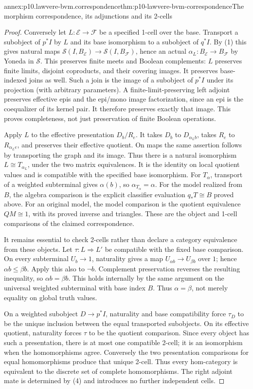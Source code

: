 \begin{annexitem}{annex:p10.lawvere-bvm.correspondence}{thm:p10-lawvere-bvm-correspondence}{The morphism correspondence, its adjunctions and its 2-cells}
\begin{proof}
Conversely let \(L:\mathcal E\to\mathcal F\) be a specified
1-cell over the base. Transport a subobject of \(p^*I\) by \(L\)
and its base isomorphism to a subobject of \(q^*I\).
By (1) this gives natural maps
\(\mathcal S(I,B_{\mathcal E})\to
\mathcal S(I,B_{\mathcal F})\), hence an actual
\(\alpha_L:B_{\mathcal E}\to B_{\mathcal F}\) by Yoneda in
\(\mathcal S\). This preserves finite meets and Boolean
complements: \(L\) preserves finite limits, disjoint coproducts,
and their covering images. It preserves base-indexed joins as well.
Such a join is the image of a subobject of \(p^*I\) under its
projection (with arbitrary parameters). A finite-limit-preserving
left adjoint preserves effective epis and the epi/mono image
factorization, since an epi is the coequalizer of its kernel pair.
It therefore preserves exactly that image. This proves completeness,
not just preservation of finite Boolean operations.

Apply \(L\) to the effective presentation \(D_b/R_e\).
It takes \(D_b\) to \(D_{\alpha_L b}\), takes \(R_e\)
to \(R_{\alpha_L e}\), and preserves their effective quotient.
On maps the same assertion follows by transporting the graph and its
image. Thus there is a natural isomorphism
\(L\cong T_{\alpha_L}\), under the two matrix equivalences.
It is the identity on local quotient values and is compatible with
the specified base isomorphism. For \(T_\alpha\), transport of
a weighted subterminal gives \(\alpha(b)\), so
\(\alpha_{T_\alpha}=\alpha\). For the model realized from \(B\),
the algebra comparison is the explicit classifier evaluation
\(q_*T\cong B\) proved above. For an original model, the
model comparison is the quotient equivalence \(QM\cong1\),
with its proved inverse and triangles. These are the object and
1-cell comparisons of the claimed correspondence.

It remains essential to check 2-cells rather than declare a category
equivalence from these objects. Let \(\tau:L\Rightarrow L'\)
be compatible with the fixed base comparison. On every subterminal
\(U_b\to1\), naturality gives a map
\(U_{\alpha b}\to U_{\beta b}\) over \(1\); hence
\(\alpha b\le\beta b\). Apply this also to \(\neg b\).
Complement preservation reverses the resulting inequality, so
\(\alpha b=\beta b\). This holds internally by the same argument
on the universal weighted subterminal with base index \(B\).
Thus \(\alpha=\beta\), not merely equality on global truth values.

On a weighted subobject \(D\to p^*I\), naturality and base
compatibility force \(\tau_D\) to be the unique inclusion between
the equal transported subobjects. On its effective quotient, naturality
forces \(\tau\) to be the quotient comparison. Since every object
has such a presentation, there is at most one compatible 2-cell; it is
an isomorphism when the homomorphisms agree. Conversely the two
presentation comparisons for equal homomorphisms produce that unique
2-cell. Thus every hom-category is equivalent to the discrete set of
complete homomorphisms. The right adjoint mate is determined by (4)
and introduces no further independent cells.


\end{proof}
\end{annexitem}
